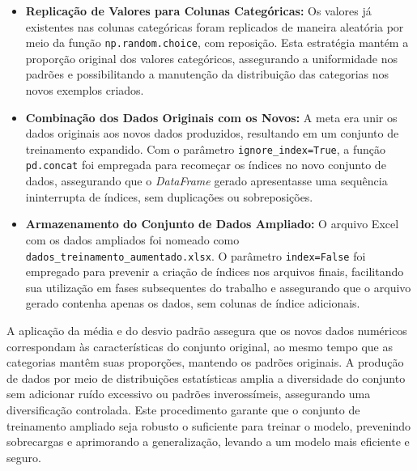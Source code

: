 \begin{itemize}
  \item \textbf{Replicação de Valores para Colunas Categóricas:} Os valores já existentes nas colunas categóricas foram replicados de maneira aleatória por meio da função \texttt{np.random.choice}, com reposição. Esta estratégia mantém a proporção original dos valores categóricos, assegurando a uniformidade nos padrões e possibilitando a manutenção da distribuição das categorias nos novos exemplos criados.

  \item \textbf{Combinação dos Dados Originais com os Novos:} A meta era unir os dados originais aos novos dados produzidos, resultando em um conjunto de treinamento expandido. Com o parâmetro \texttt{ignore\_index=True}, a função \texttt{pd.concat} foi empregada para recomeçar os índices no novo conjunto de dados, assegurando que o \textit{DataFrame} gerado apresentasse uma sequência ininterrupta de índices, sem duplicações ou sobreposições.

  \item \textbf{Armazenamento do Conjunto de Dados Ampliado:} O arquivo Excel com os dados ampliados foi nomeado como \texttt{dados\_treinamento\_aumentado.xlsx}. O parâmetro \texttt{index=False} foi empregado para prevenir a criação de índices nos arquivos finais, facilitando sua utilização em fases subsequentes do trabalho e assegurando que o arquivo gerado contenha apenas os dados, sem colunas de índice adicionais.
\end{itemize}

A aplicação da média e do desvio padrão assegura que os novos dados numéricos correspondam às características do conjunto original, ao mesmo tempo que as categorias mantêm suas proporções, mantendo os padrões originais. A produção de dados por meio de distribuições estatísticas amplia a diversidade do conjunto sem adicionar ruído excessivo ou padrões inverossímeis, assegurando uma diversificação controlada. Este procedimento garante que o conjunto de treinamento ampliado seja robusto o suficiente para treinar o modelo, prevenindo sobrecargas e aprimorando a generalização, levando a um modelo mais eficiente e seguro.
